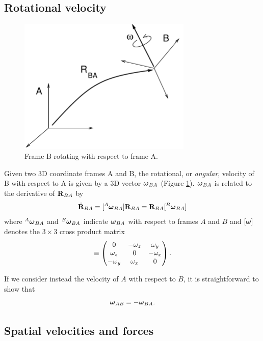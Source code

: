 \subsection{Rotational velocity}

\begin{figure}[ht]
\begin{center}
 \includegraphics[width=3.25in]{images/angularvelAB}
\end{center}
\caption{Frame B rotating with respect to frame A.}
\label{angularvelAB:fig}
\end{figure}

Given two 3D coordinate frames A and B, the rotational, or {\it
angular}, velocity of B with respect to A is given by a 3D vector
$\boldsymbol\omega_{BA}$ (Figure \ref{angularvelAB:fig}). $\boldsymbol\omega_{BA}$
is related to the derivative of ${\bf R}_{BA}$ by
%
\begin{equation}
\dot{{\bf R}}_{BA} = [{}^A\boldsymbol\omega_{BA}] {\bf R}_{BA} = {\bf R}_{BA} [{}^B\boldsymbol\omega_{BA}]
\end{equation}
%
where ${}^A\boldsymbol\omega_{BA}$ and ${}^B\boldsymbol\omega_{BA}$ indicate $\boldsymbol\omega_{BA}$ with
respect to frames $A$ and $B$ and $[ \boldsymbol\omega ]$ denotes the $3 \times 3$
cross product matrix
%
\begin{equation}
[ \Bom ] \equiv 
\matl
0 & -\omega_z & \omega_y \\
\omega_z & 0 & -\omega_x \\
-\omega_y & \omega_x & 0 \\
\matr.
\label{xprodmatrix:eqn}
\end{equation}
%

If we consider instead the velocity of $A$ with respect to $B$, it is
straightforward to show that
%
\begin{equation}
\boldsymbol\omega_{AB} = -\boldsymbol\omega_{BA}. 
\end{equation}
%

\subsection{Spatial velocities and forces}
\label{SpatialVelocitiesAndForces:sec}

